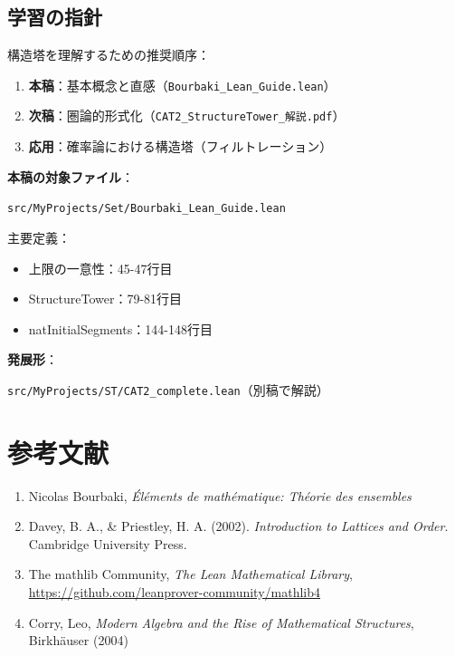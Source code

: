 \documentclass[a4paper,12pt]{ltjsarticle}
\theoremstyle{definition}
\begin{document}
\subsection{学習の指針}

構造塔を理解するための推奨順序：

\begin{enumerate}
\item \textbf{本稿}：基本概念と直感（\texttt{Bourbaki\_Lean\_Guide.lean}）
\item \textbf{次稿}：圏論的形式化（\texttt{CAT2\_StructureTower\_解説.pdf}）
\item \textbf{応用}：確率論における構造塔（フィルトレーション）
\end{enumerate}

\begin{tcolorbox}[colback=gray!10, colframe=black, title=Lean 4コードへのリンク]
\textbf{本稿の対象ファイル}：

\texttt{src/MyProjects/Set/Bourbaki\_Lean\_Guide.lean}

主要定義：
\begin{itemize}
\item 上限の一意性：45-47行目
\item StructureTower：79-81行目
\item natInitialSegments：144-148行目
\end{itemize}

\textbf{発展形}：

\texttt{src/MyProjects/ST/CAT2\_complete.lean}（別稿で解説）
\end{tcolorbox}

\section*{参考文献}

\begin{enumerate}
\item Nicolas Bourbaki, \textit{Éléments de mathématique: Théorie des ensembles}
\item Davey, B. A., \& Priestley, H. A. (2002). \textit{Introduction to Lattices and Order}. Cambridge University Press.
\item The mathlib Community, \textit{The Lean Mathematical Library}, \url{https://github.com/leanprover-community/mathlib4}
\item Corry, Leo, \textit{Modern Algebra and the Rise of Mathematical Structures}, Birkhäuser (2004)
\end{enumerate}
\end{document}
